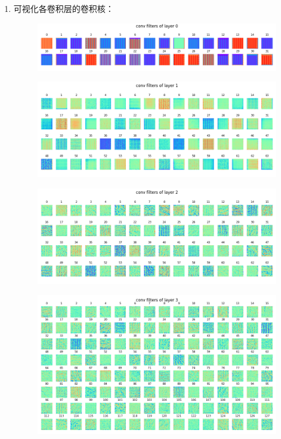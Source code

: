 \documentclass[a4paper]{article}
\begin{document}
\begin{enumerate}
\begin{enumerate}
        \item 可视化各卷积层的卷积核：
        \begin{figure}[H]
            \centering
            \includegraphics[width=0.65\linewidth]{../result/4_conv_filters_layer0.png}
            \caption{}
        \end{figure}
        \begin{figure}[H]
            \centering
            \includegraphics[width=0.65\linewidth]{../result/4_filter_layer1.png}
            \caption{}
        \end{figure}
        \begin{figure}[H]
            \centering
            \includegraphics[width=0.65\linewidth]{../result/4_filter_layer2.png}
            \caption{}
        \end{figure}
        \begin{figure}[H]
            \centering
            \includegraphics[width=0.65\linewidth]{../result/4_filter_layer3.png}
            \caption{}
        \end{figure}
        \begin{figure}[H]

\end{figure}
\end{enumerate}
\end{enumerate}
\end{document}
